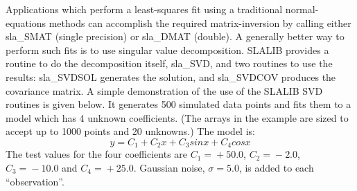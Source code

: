 \documentclass[11pt,twoside,nolof]{starlink}
\begin{document}
Applications which perform a least-squares fit using a traditional
normal-equations methods can accomplish the required matrix-inversion
by calling either
sla\_SMAT
(single precision) or
sla\_DMAT
(double).  A generally better way to perform such fits is
to use singular value decomposition.  SLALIB provides a routine
to do the decomposition itself,
sla\_SVD,
and two routines to use the results:
sla\_SVDSOL
generates the solution, and
sla\_SVDCOV
produces the covariance matrix.
A simple demonstration of the use of the SLALIB SVD
routines is given below.  It generates 500 simulated data
points and fits them to a model which has 4 unknown coefficients.
(The arrays in the example are sized to accept up to 1000
points and 20 unknowns.)  The model is:
\[ y = C_{1} +C_{2}x +C_{3}sin{x} +C_{4}cos{x} \]
The test values for the four coefficients are
$C_1\!=\!+50.0$,
$C_2\!=\!-2.0$,
$C_3\!=\!-10.0$ and
$C_4\!=\!+25.0$.
Gaussian noise, $\sigma=5.0$, is added to each ``observation''.
\goodbreak
\end{document}
